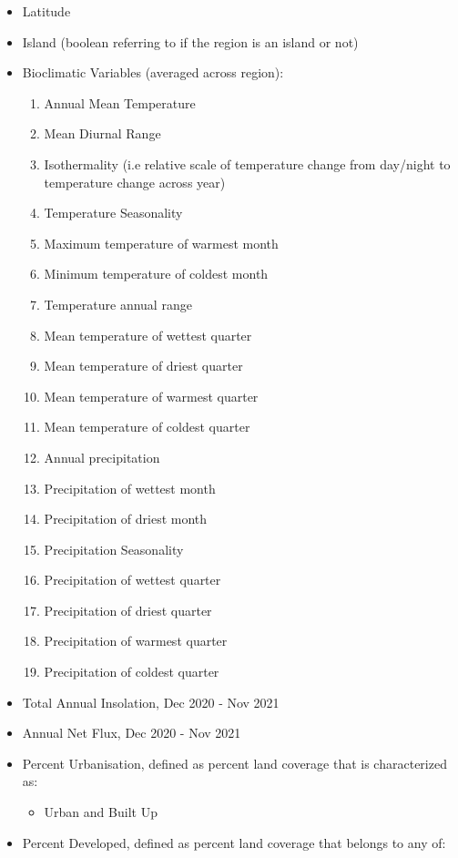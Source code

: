\documentclass[prl,showpacs,superscriptaddress,twocolumn,longbibliography]{revtex4-1}
\begin{document}
\begin{itemize}
\item Latitude
\item Island (boolean referring to if the region is an island or not)
\item Bioclimatic Variables (averaged across region)\cite{fick_worldclim_2017}:
\begin{enumerate}
	\item Annual Mean Temperature
	\item Mean Diurnal Range
	\item Isothermality (i.e relative scale of temperature change from day/night to temperature change across year)
	\item Temperature Seasonality
	\item Maximum temperature of warmest month
	\item Minimum temperature of coldest month
	\item Temperature annual range
	\item Mean temperature of wettest quarter
	\item Mean temperature of driest quarter
	\item Mean temperature of warmest quarter
	\item Mean temperature of coldest quarter
	\item Annual precipitation
	\item Precipitation of wettest month
	\item Precipitation of driest month
	\item Precipitation Seasonality
	\item Precipitation of wettest quarter
	\item Precipitation of driest quarter
	\item Precipitation of warmest quarter
	\item Precipitation of coldest quarter
\end{enumerate}
\item Total Annual Insolation, Dec 2020 - Nov 2021\cite{nasa_insol}
\item Annual Net Flux, Dec 2020 - Nov 2021\cite{nasa_netflux}
\item Percent Urbanisation, defined as percent land coverage that is characterized as:
\begin{itemize}
	\item Urban and Built Up\cite{nasa_landcov}
\end{itemize}
\item Percent Developed, defined as percent land coverage that belongs to any of:

\end{itemize}
\end{document}
